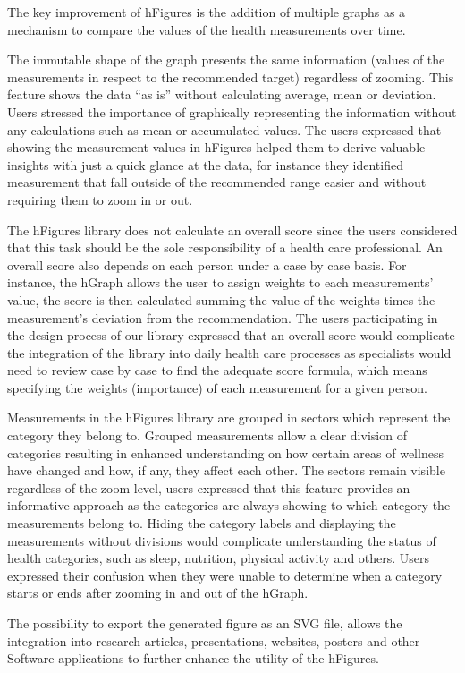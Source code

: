 \documentclass[twocolumn]{bmcart}%
\begin{document}
The key improvement of hFigures is the addition of multiple graphs as a mechanism to compare the values of the health measurements over time.

The immutable shape of the graph presents the same information (values of the measurements in respect to the recommended target) regardless of zooming. This feature shows the data ``as is'' without calculating average, mean or deviation. Users stressed the importance of graphically representing the information without any calculations such as mean or accumulated values. The users expressed that showing the measurement values in hFigures helped them to derive valuable insights with just a quick glance at the data, for instance they identified measurement that fall outside of the recommended range easier and without requiring them to zoom in or out.

The hFigures library does not calculate an overall score since the users considered that this task should be the sole responsibility of a health care professional. An overall score also depends on each person under a case by case basis. For instance, the hGraph allows the user to assign weights to each measurements' value, the score is then calculated summing the value of the weights times the measurement's deviation from the recommendation. The users participating in the design process of our library expressed that an overall score would complicate the integration of the library into daily health care processes as specialists would need to review case by case to find the adequate score formula, which means specifying the weights (importance) of each measurement for a given person.

Measurements in the hFigures library are grouped in sectors which represent the category they belong to. Grouped measurements allow a clear division of categories resulting in enhanced understanding on how certain areas of wellness have changed and how, if any, they affect each other. The sectors remain visible regardless of the zoom level, users expressed that this feature provides an informative approach as the categories are always showing to which category the measurements belong to. Hiding the category labels and displaying the measurements without divisions would complicate understanding the status of health categories, such as sleep, nutrition, physical activity and others. Users expressed their confusion when they were unable to determine when a category starts or ends after zooming in and out of the hGraph.

The possibility to export the generated figure as an SVG file, allows the integration into research articles, presentations, websites, posters and other Software applications to further enhance the utility of the hFigures.
\end{document}
